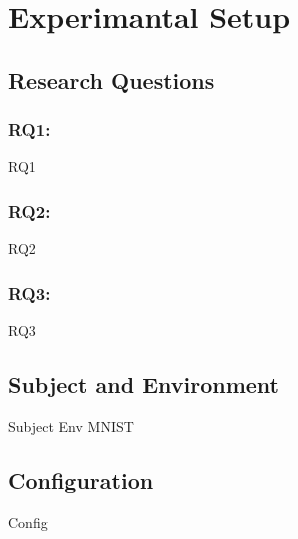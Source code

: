 \section{Experimantal Setup}
\label{sec:setup}

\subsection{Research Questions}
\label{sec:rq}

\subsubsection{RQ1: }
\label{sec:rq1}
RQ1

\subsubsection{RQ2: }
\label{sec:rq2}
RQ2

\subsubsection{RQ3: }
\label{sec:rq3}
RQ3

\subsection{Subject and Environment}
\label{sec:subject}

Subject
Env
MNIST

\subsection{Configuration}
\label{sec:configuration}


Config
